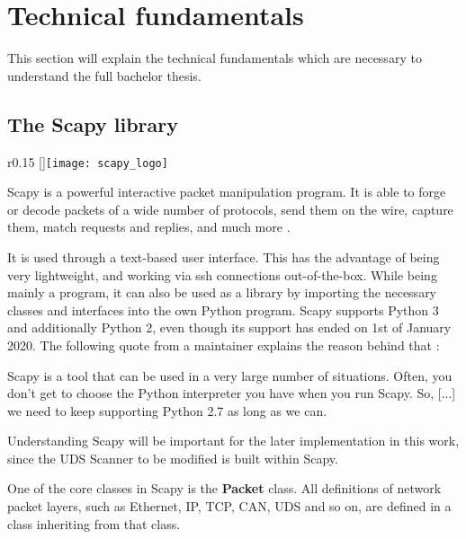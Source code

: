 \section{Technical fundamentals}

This section will explain the technical fundamentals which are necessary to understand the full bachelor thesis.

\subsection{The Scapy library}
\label{sec:scapy}

\begin{wrapfigure}{r}{0.15\textwidth}
    \raisebox{0pt}[\dimexpr{}\baselineskip\relax]{\texttt{[image: scapy\_logo]}}
\end{wrapfigure}

Scapy is a powerful interactive packet manipulation program. It is able to forge or decode packets of a wide number of protocols, send them on the wire, capture them, match requests and replies, and much more \cite{scapy}.

It is used through a text-based user interface. This has the advantage of being very lightweight, and working via ssh connections out-of-the-box. While being mainly a program, it can also be used as a library by importing the necessary classes and interfaces into the own Python program. Scapy supports Python 3 and additionally Python 2, even though its support has ended on 1st of January 2020. The following quote from a maintainer explains the reason behind that \cite{scapy-py2}:

\begin{displayquote}
    Scapy is a tool that can be used in a very large number of situations. Often, you don't get to choose the Python interpreter you have when you run Scapy. So, [...] we need to keep supporting Python 2.7 as long as we can.
\end{displayquote}

Understanding Scapy will be important for the later implementation in this work, since the UDS Scanner to be modified is built within Scapy.

One of the core classes in Scapy is the \textbf{Packet} class. All definitions of network packet layers, such as Ethernet, IP, TCP, CAN, UDS and so on, are defined in a class inheriting from that class.

